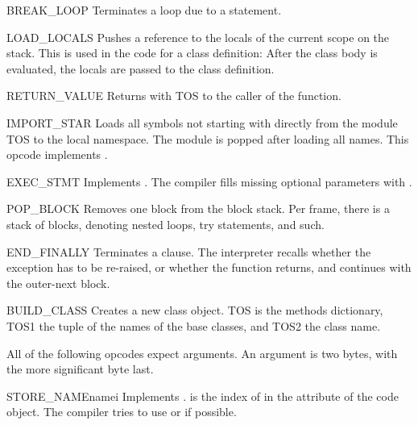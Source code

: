 \begin{opcodedesc}{BREAK_LOOP}{}
Terminates a loop due to a  statement.
\end{opcodedesc}

\begin{opcodedesc}{LOAD_LOCALS}{}
Pushes a reference to the locals of the current scope on the stack.
This is used in the code for a class definition: After the class body
is evaluated, the locals are passed to the class definition.
\end{opcodedesc}

\begin{opcodedesc}{RETURN_VALUE}{}
Returns with TOS to the caller of the function.
\end{opcodedesc}

\begin{opcodedesc}{IMPORT_STAR}{}
Loads all symbols not starting with \character{_} directly from the module TOS
to the local namespace. The module is popped after loading all names.
This opcode implements .
\end{opcodedesc}

\begin{opcodedesc}{EXEC_STMT}{}
Implements .  The compiler fills
missing optional parameters with .
\end{opcodedesc}

\begin{opcodedesc}{POP_BLOCK}{}
Removes one block from the block stack.  Per frame, there is a 
stack of blocks, denoting nested loops, try statements, and such.
\end{opcodedesc}

\begin{opcodedesc}{END_FINALLY}{}
Terminates a  clause.  The interpreter recalls
whether the exception has to be re-raised, or whether the function
returns, and continues with the outer-next block.
\end{opcodedesc}

\begin{opcodedesc}{BUILD_CLASS}{}
Creates a new class object.  TOS is the methods dictionary, TOS1
the tuple of the names of the base classes, and TOS2 the class name.
\end{opcodedesc}

All of the following opcodes expect arguments.  An argument is two
bytes, with the more significant byte last.

\begin{opcodedesc}{STORE_NAME}{namei}
Implements .  is the index of 
in the attribute  of the code object.
The compiler tries to use  or 
if possible.
\end{opcodedesc}

